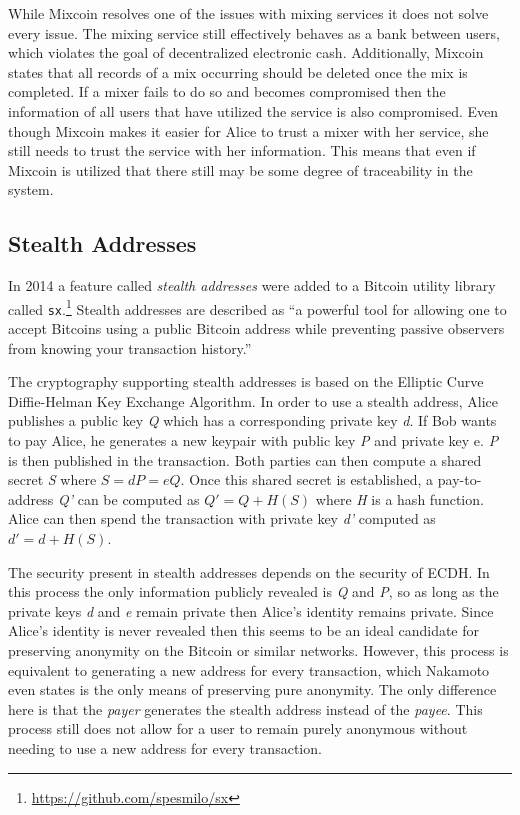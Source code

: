\documentclass[11pt]{article}
\begin{document}
While Mixcoin resolves one of the issues with mixing services it does not solve every issue. The mixing service
still effectively behaves as a bank between users, which violates the goal of decentralized electronic cash.
Additionally, Mixcoin states that all records of a mix occurring should be deleted once the mix is completed. If
a mixer fails to do so and becomes compromised then the information of all users that have utilized the service
is also compromised.  Even though Mixcoin makes it easier for Alice to trust a mixer with her service, she still
needs to trust the service with her information. This means that even if Mixcoin is utilized that there still
may be some degree of traceability in the system.

\subsection{Stealth Addresses}
In 2014 a feature called \emph{stealth addresses} were added to a Bitcoin utility library called
\texttt{sx}.\footnote{\url{https://github.com/spesmilo/sx}} Stealth addresses are described as ``a powerful tool for
allowing one to accept Bitcoins using a public Bitcoin address while preventing passive observers from knowing your
transaction history.''\cite{stealth}

The cryptography supporting stealth addresses is based on the Elliptic Curve Diffie-Helman Key Exchange
Algorithm. In order to use a stealth address, Alice publishes a public key \emph{Q} which has a corresponding
private key \emph{d}. If Bob wants to pay Alice, he generates a new keypair with public key \emph{P} and private
key {e}. \emph{P} is then published in the transaction. Both parties can then compute a shared secret \emph{S}
where $S = dP = eQ$. Once this shared secret is established, a pay-to-address \emph{Q'} can be computed as $Q' =
Q + H(S)$ where \emph{H} is a hash function. Alice can then spend the transaction with private key \emph{d'}
computed as $d' = d + H(S)$.

The security present in stealth addresses depends on the security of ECDH. In this process the only information
publicly revealed is \emph{Q} and \emph{P}, so as long as the private keys \emph{d} and \emph{e} remain private
then Alice's identity remains private. Since Alice's identity is never revealed then this seems to be an ideal candidate
for preserving anonymity on the Bitcoin or similar networks. However, this process is equivalent to generating a new
address for every transaction, which Nakamoto even states is the only means of preserving pure
anonymity.\cite{nakamoto08} The only difference here is that the \emph{payer} generates the stealth address instead of
the \emph{payee}. This process still does not allow for a user to remain purely anonymous without needing to use a new
address for every transaction.


\end{document}
